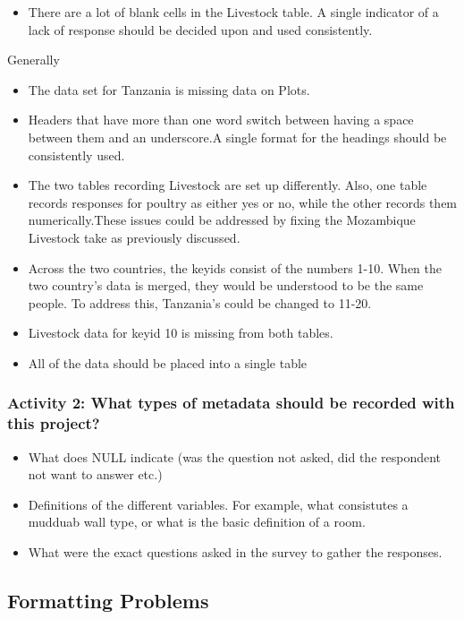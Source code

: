 \documentclass{article}
\begin{document}
\begin{FlushLeft}
\begin{itemize}
\item There are a lot of blank cells in the Livestock table. A single indicator of a lack of response should be decided upon and used consistently.
\end{itemize}
Generally
\begin{itemize}
\item The data set for Tanzania is missing data on Plots.
\item Headers that have more than one word switch between having a space between them and an underscore.A single format for the headings should be consistently used.
\item The two tables recording Livestock are set up differently. Also, one table records responses for poultry as either yes or no, while the other records them numerically.These issues could be addressed by fixing the Mozambique Livestock take as previously discussed.
\item Across the two countries, the key\textunderscore ids consist of the numbers 1-10. When the two country’s data is merged, they would be understood to be the same people. To address this, Tanzania’s could be changed to 11-20.
\item Livestock data for key\textunderscore id 10 is missing from both tables.
\item All of the data should be placed into a single table
\end{itemize}
\subsubsection*{Activity 2: What types of metadata should be recorded with this project?}
\begin{itemize}
\item What does NULL indicate (was the question not asked, did the respondent not want to answer etc.) 
\item Definitions of the different variables. For example, what consistutes a mudduab wall type, or what is the basic definition of a room.
\item What were the exact questions asked in the survey to gather the responses.
\end{itemize}

\subsection{Formatting Problems}

\end{FlushLeft}
\end{document}
